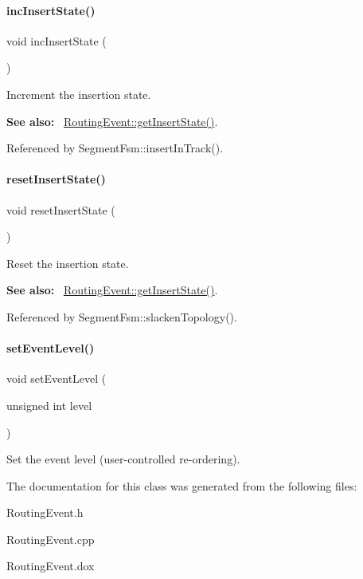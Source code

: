 \paragraph{\texorpdfstring{inc\+Insert\+State()}{incInsertState()}}
{\footnotesize\ttfamily void inc\+Insert\+State (\begin{DoxyParamCaption}{ }\end{DoxyParamCaption})\hspace{0.3cm}{\ttfamily [inline]}}

Increment the insertion state.

{\bfseries See also\+:}~ \mbox{\hyperlink{classKite_1_1RoutingEvent_a00f02910915e7deb857f023e5d584c08}{Routing\+Event\+::get\+Insert\+State()}}. 

Referenced by Segment\+Fsm\+::insert\+In\+Track().

\mbox{\label{classKite_1_1RoutingEvent_ae35f271a106f6c6a6039e4a6f8bf4009}} 
\paragraph{\texorpdfstring{reset\+Insert\+State()}{resetInsertState()}}
{\footnotesize\ttfamily void reset\+Insert\+State (\begin{DoxyParamCaption}{ }\end{DoxyParamCaption})\hspace{0.3cm}{\ttfamily [inline]}}

Reset the insertion state.

{\bfseries See also\+:}~ \mbox{\hyperlink{classKite_1_1RoutingEvent_a00f02910915e7deb857f023e5d584c08}{Routing\+Event\+::get\+Insert\+State()}}. 

Referenced by Segment\+Fsm\+::slacken\+Topology().

\mbox{\label{classKite_1_1RoutingEvent_a70a9ecd62b806eff001aa602132cc630}} 
\paragraph{\texorpdfstring{set\+Event\+Level()}{setEventLevel()}}
{\footnotesize\ttfamily void set\+Event\+Level (\begin{DoxyParamCaption}\item[{unsigned int}]{level }\end{DoxyParamCaption})\hspace{0.3cm}{\ttfamily [inline]}}

Set the event level (user-\/controlled re-\/ordering). 

The documentation for this class was generated from the following files\+:\begin{DoxyCompactItemize}
\item 
Routing\+Event.\+h\item 
Routing\+Event.\+cpp\item 
Routing\+Event.\+dox\end{DoxyCompactItemize}
